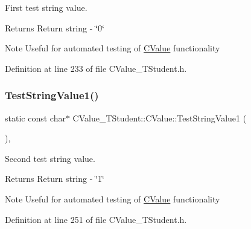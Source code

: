 First test string value. 

\begin{DoxyReturn}{Returns}
Return string -\/ \char`\"{}0\char`\"{} 
\end{DoxyReturn}
\begin{DoxyNote}{Note}
Useful for automated testing of \hyperlink{class_c_value___t_student_1_1_c_value}{C\+Value} functionality 
\end{DoxyNote}


Definition at line 233 of file C\+Value\+\_\+\+T\+Student.\+h.

\mbox{\label{class_c_value___t_student_1_1_c_value_a0454785a06a1974c4b969d7684b46f2b}} 
\subsubsection{\texorpdfstring{Test\+String\+Value1()}{TestStringValue1()}}
{\footnotesize\ttfamily static const char$\ast$ C\+Value\+\_\+\+T\+Student\+::\+C\+Value\+::\+Test\+String\+Value1 (\begin{DoxyParamCaption}{ }\end{DoxyParamCaption})\hspace{0.3cm}{\ttfamily [inline]}, {\ttfamily [static]}}



Second test string value. 

\begin{DoxyReturn}{Returns}
Return string -\/ \char`\"{}1\char`\"{} 
\end{DoxyReturn}
\begin{DoxyNote}{Note}
Useful for automated testing of \hyperlink{class_c_value___t_student_1_1_c_value}{C\+Value} functionality 
\end{DoxyNote}


Definition at line 251 of file C\+Value\+\_\+\+T\+Student.\+h.

\mbox{\label{class_c_value___t_student_1_1_c_value_af49bae0a3cb30d58c8528e168693558b}} 

